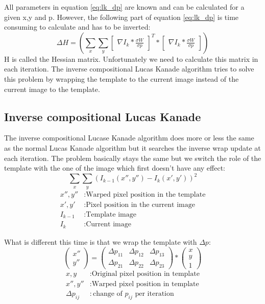 \documentclass[11pt,a4paper,titlepage,oneside]{report}
\begin{document}
All parameters in equation \ref{eq:lk_dp} are known and can be calculated for a given x,y and p. However, the following part of equation \ref{eq:lk_dp} is time consuming to calculate and has to be inverted:
\begin{equation}
	\Delta H=(\sum_x\sum_y\begin{bmatrix}\nabla I_{k}*\frac{\sigma W}{\sigma p}\end{bmatrix}^T*\begin{bmatrix}\nabla I_{k}*\frac{\sigma W}{\sigma p}\end{bmatrix})
\end{equation}
H is called the Hessian matrix. Unfortunately we need to calculate this matrix in each iteration. The inverse compositional Lucas Kanade algorithm tries to solve this problem by wrapping the template to the current image instead of the current image to the template.

\subsection{Inverse compositional Lucas Kanade}

The inverse compositional Lucase Kanade algorithm does more or less the same as the normal Lucas Kanade algorithm but it searches the inverse wrap update at each iteration. The problem basically stays the same but we switch the role of the template with the one of the image which first doesn't have any effect:
\begin{equation}\label{eq:iclk_problem}
	\sum_x\sum_y(I_{k-1}(x'',y'')-I_{k}(x',y'))^2
\end{equation}
\begin{align*}
	x'',y''		&:	\text{Warped pixel position in the template}\\
	x',y'			&:	\text{Pixel position in the current image}\\
	I_{k-1}		&:	\text{Template image}\\
	I_{k}			&:	\text{Current image}
\end{align*}

What is different this time is that we wrap the template with $\Delta p$:
\begin{equation}
	\begin{pmatrix}
		x'' \\
		y''
	\end{pmatrix}=
	\begin{pmatrix}
		\Delta p_{11} & \Delta p_{12} & \Delta p_{13} \\
		\Delta p_{21} & \Delta p_{22} & \Delta p_{23}
	\end{pmatrix}*
	\begin{pmatrix}
		x\\
		y\\
		1
	\end{pmatrix}
\end{equation}
\begin{align*}
	x,y						&:	\text{Original pixel position in template}\\
	x'',y''				&:	\text{Warped pixel position in template}\\
	\Delta p_{ij}	&:	\text{change of $p_{ij}$ per iteration}
\end{align*}
\end{document}
